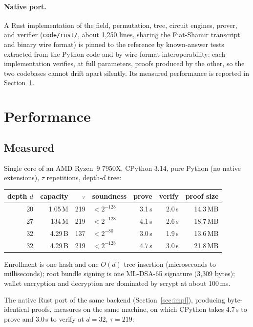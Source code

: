\documentclass[11pt]{article}
\theoremstyle{definition}
\begin{document}
\paragraph{Native port.} A Rust implementation of the field, permutation, tree, circuit
engines, prover, and verifier (\texttt{code/rust/}, about 1{,}250 lines, sharing the
Fiat-Shamir transcript and binary wire format) is pinned to the reference by known-answer
tests extracted from the Python code and by wire-format interoperability: each
implementation verifies, at full parameters, proofs produced by the other, so the two
codebases cannot drift apart silently. Its measured performance is reported in
Section~\ref{sec:perf}.

\section{Performance}
\label{sec:perf}

\subsection{Measured}

Single core of an AMD Ryzen~9 7950X, CPython 3.14, pure Python (no native
extensions), $\tau$ repetitions, depth-$d$ tree:

\begin{center}
\begin{tabular}{rrrlrrr}
\toprule
depth $d$ & capacity & $\tau$ & soundness & prove & verify & proof size \\
\midrule
20 & 1.05\,M  & 219 & $< 2^{-128}$ & 3.1\,s & 2.0\,s & 14.3\,MB \\
27 & 134\,M   & 219 & $< 2^{-128}$ & 4.1\,s & 2.6\,s & 18.7\,MB \\
32 & 4.29\,B  & 137 & $< 2^{-80}$  & 3.0\,s & 1.9\,s & 13.6\,MB \\
32 & 4.29\,B  & 219 & $< 2^{-128}$ & 4.7\,s & 3.0\,s & 21.8\,MB \\
\bottomrule
\end{tabular}
\end{center}

Enrollment is one hash and one $O(d)$ tree insertion (microseconds to milliseconds); root
bundle signing is one ML-DSA-65 signature (3{,}309 bytes); wallet encryption and
decryption are dominated by scrypt at about 100\,ms.

The native Rust port of the same backend (Section~\ref{sec:impl}), producing
byte-identical proofs, measures on the same machine, on which CPython takes 4.7\,s to
prove and 3.0\,s to verify at $d = 32$, $\tau = 219$:
\end{document}
